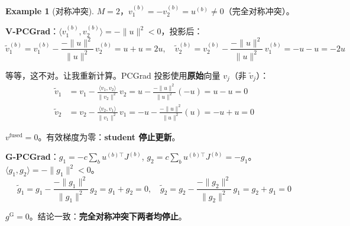 \documentclass[11pt,a4paper]{article}
\theoremstyle{definition}
\newtheorem{example}{Example}
\begin{document}
\begin{example}[对称冲突]
$M=2$，$v_1^{(b)} = -v_2^{(b)} = u^{(b)} \neq 0$（完全对称冲突）。

\textbf{V-PCGrad}：$\langle v_1^{(b)}, v_2^{(b)}\rangle = -\|u\|^2 < 0$，投影后：
\begin{equation}
\tilde{v}_1^{(b)} = v_1^{(b)} - \frac{-\|u\|^2}{\|u\|^2}\,v_2^{(b)} = u + u = 2u, \quad
\tilde{v}_2^{(b)} = v_2^{(b)} - \frac{-\|u\|^2}{\|u\|^2}\,v_1^{(b)} = -u - u = -2u
\end{equation}

等等，这不对。让我重新计算。PCGrad 投影使用\textbf{原始}向量 $v_j$（非 $\tilde{v}_j$）：
\begin{align}
\tilde{v}_1 &= v_1 - \frac{\langle v_1, v_2\rangle}{\|v_2\|^2}\,v_2
= u - \frac{-\|u\|^2}{\|u\|^2}(-u) = u - u = 0 \\
\tilde{v}_2 &= v_2 - \frac{\langle v_2, v_1\rangle}{\|v_1\|^2}\,v_1
= -u - \frac{-\|u\|^2}{\|u\|^2}(u) = -u + u = 0
\end{align}

$v^{\mathrm{fused}} = 0$。有效梯度为零：\textbf{student 停止更新}。

\textbf{G-PCGrad}：$g_1 = -c\sum_b u^{(b)\top}J^{(b)}$, $g_2 = c\sum_b u^{(b)\top}J^{(b)} = -g_1$。$\langle g_1, g_2\rangle = -\|g_1\|^2 < 0$。
\begin{equation}
\tilde{g}_1 = g_1 - \frac{-\|g_1\|^2}{\|g_1\|^2}\,g_2 = g_1 + g_2 = 0, \quad
\tilde{g}_2 = g_2 - \frac{-\|g_2\|^2}{\|g_2\|^2}\,g_1 = g_2 + g_1 = 0
\end{equation}

$g^{\mathrm{G}} = 0$。结论一致：\textbf{完全对称冲突下两者均停止}。
\end{example}
\end{document}
